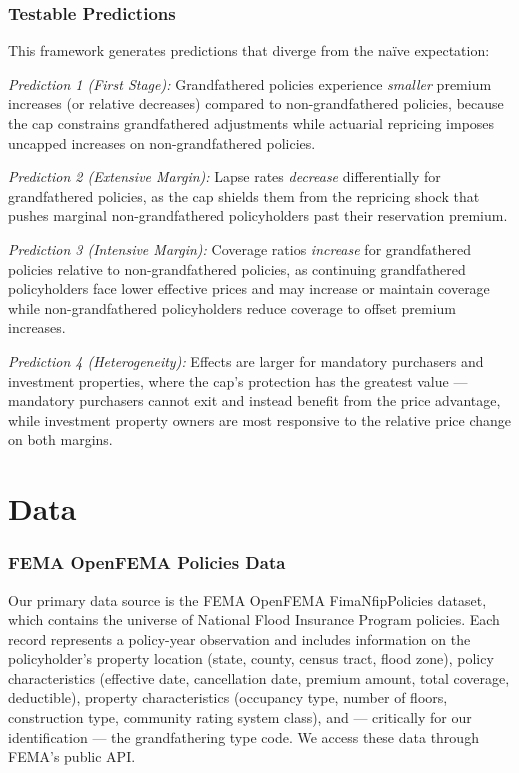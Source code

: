 \documentclass[12pt]{article}
\begin{document}
\subsubsection*{Testable Predictions} This framework generates predictions that diverge from the na\"ive expectation:

\textit{Prediction 1 (First Stage):} Grandfathered policies experience \textit{smaller} premium increases (or relative decreases) compared to non-grandfathered policies, because the cap constrains grandfathered adjustments while actuarial repricing imposes uncapped increases on non-grandfathered policies.

\textit{Prediction 2 (Extensive Margin):} Lapse rates \textit{decrease} differentially for grandfathered policies, as the cap shields them from the repricing shock that pushes marginal non-grandfathered policyholders past their reservation premium.

\textit{Prediction 3 (Intensive Margin):} Coverage ratios \textit{increase} for grandfathered policies relative to non-grandfathered policies, as continuing grandfathered policyholders face lower effective prices and may increase or maintain coverage while non-grandfathered policyholders reduce coverage to offset premium increases.

\textit{Prediction 4 (Heterogeneity):} Effects are larger for mandatory purchasers and investment properties, where the cap's protection has the greatest value --- mandatory purchasers cannot exit and instead benefit from the price advantage, while investment property owners are most responsive to the relative price change on both margins.


\section{Data}
\label{sec:data}

\subsubsection*{FEMA OpenFEMA Policies Data} Our primary data source is the FEMA OpenFEMA FimaNfipPolicies dataset, which contains the universe of National Flood Insurance Program policies. Each record represents a policy-year observation and includes information on the policyholder's property location (state, county, census tract, flood zone), policy characteristics (effective date, cancellation date, premium amount, total coverage, deductible), property characteristics (occupancy type, number of floors, construction type, community rating system class), and --- critically for our identification --- the grandfathering type code. We access these data through FEMA's public API.
\end{document}
